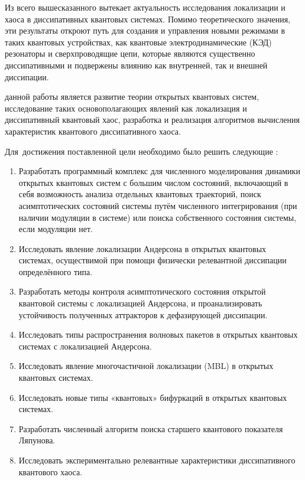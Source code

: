 Из всего вышесказанного вытекает актуальность исследования локализации и хаоса в диссипативных квантовых системах. Помимо теоретического значения, эти результаты откроют путь для создания и управления новыми режимами в таких квантовых устройствах, как квантовые электродинамические (КЭД) резонаторы \autocite{Imamoglu1999, Walther2006, Arakawa2015} и сверхпроводящие цепи, которые являются существенно диссипативными и подвержены влиянию как внутренней, так и внешней диссипации.

{\aim} данной работы является развитие теории открытых квантовых систем, исследование таких основополагающих явлений как локализация и диссипативный квантовый хаос, разработка и реализация алгоритмов вычисления характеристик квантового диссипативного хаоса.

Для~достижения поставленной цели необходимо было решить следующие {\tasks}:
\begin{enumerate}[beginpenalty=10000] %
	\item Разработать программный комплекс для численного моделирования динамики открытых квантовых систем с большим числом состояний, включающий в себя возможность анализа отдельных квантовых траекторий, поиск асимптотических состояний системы путём численного интегрирования (при наличии модуляции в системе) или поиска собственного состояния системы, если модуляции нет.
	\item Исследовать явление локализации Андерсона в открытых квантовых системах, осуществимой при помощи физически релевантной диссипации определённого типа.
	\item Разработать методы контроля асимптотического состояния открытой квантовой системы с локализацией Андерсона, и проанализировать устойчивость полученных аттракторов к дефазирующей диссипации.
	\item Исследовать типы распространения волновых пакетов в открытых квантовых системах с локализацией Андерсона.
	\item Исследовать явление многочастичной локализации (MBL) в открытых квантовых системах.
	\item Исследовать новые типы «квантовых» бифуркаций в открытых квантовых системах.
	\item Разработать численный алгоритм поиска старшего квантового показателя Ляпунова.
	\item Исследовать экспериментально релевантные характеристики диссипативного квантового хаоса.
\end{enumerate}


